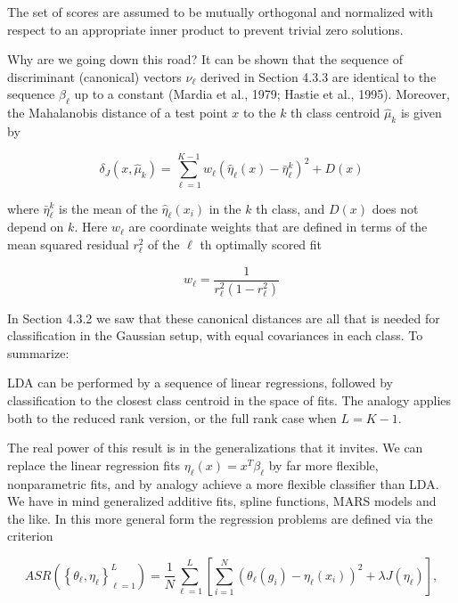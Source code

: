 \documentclass[10pt]{article}
\begin{document}
The set of scores are assumed to be mutually orthogonal and normalized with respect to an appropriate inner product to prevent trivial zero solutions.

Why are we going down this road? It can be shown that the sequence of discriminant (canonical) vectors $\nu_{\ell}$ derived in Section 4.3.3 are identical to the sequence $\beta_{\ell}$ up to a constant (Mardia et al., 1979; Hastie et al., 1995). Moreover, the Mahalanobis distance of a test point $x$ to the $k$ th class centroid $\hat{\mu}_{k}$ is given by


\begin{equation*}
\delta_{J}\left(x, \hat{\mu}_{k}\right)=\sum_{\ell=1}^{K-1} w_{\ell}\left(\hat{\eta}_{\ell}(x)-\bar{\eta}_{\ell}^{k}\right)^{2}+D(x) \tag{12.54}
\end{equation*}


where $\bar{\eta}_{\ell}^{k}$ is the mean of the $\hat{\eta}_{\ell}\left(x_{i}\right)$ in the $k$ th class, and $D(x)$ does not depend on $k$. Here $w_{\ell}$ are coordinate weights that are defined in terms of the mean squared residual $r_{\ell}^{2}$ of the $\ell$ th optimally scored fit


\begin{equation*}
w_{\ell}=\frac{1}{r_{\ell}^{2}\left(1-r_{\ell}^{2}\right)} \tag{12.55}
\end{equation*}


In Section 4.3.2 we saw that these canonical distances are all that is needed for classification in the Gaussian setup, with equal covariances in each class. To summarize:

LDA can be performed by a sequence of linear regressions, followed by classification to the closest class centroid in the space of fits. The analogy applies both to the reduced rank version, or the full rank case when $L=K-1$.

The real power of this result is in the generalizations that it invites. We can replace the linear regression fits $\eta_{\ell}(x)=x^{T} \beta_{\ell}$ by far more flexible, nonparametric fits, and by analogy achieve a more flexible classifier than LDA. We have in mind generalized additive fits, spline functions, MARS models and the like. In this more general form the regression problems are defined via the criterion


\begin{equation*}
A S R\left(\left\{\theta_{\ell}, \eta_{\ell}\right\}_{\ell=1}^{L}\right)=\frac{1}{N} \sum_{\ell=1}^{L}\left[\sum_{i=1}^{N}\left(\theta_{\ell}\left(g_{i}\right)-\eta_{\ell}\left(x_{i}\right)\right)^{2}+\lambda J\left(\eta_{\ell}\right)\right], \tag{12.56}
\end{equation*}
\end{document}
